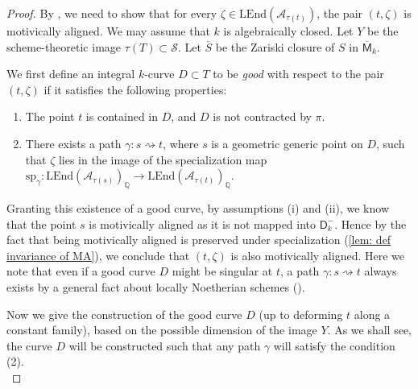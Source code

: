 \documentclass[11pt, letterpaper]{amsart}
\theoremstyle{plain}
\theoremstyle{definition}
\newcommand{\IQ}{\mathbb{Q}}
\newcommand{\<}{\langle}
\renewcommand{\>}{\rangle}
\newcommand{\shS}{\mathscr{S}}
\newcommand{\sfD}{\mathsf{D}}
\newcommand{\sfM}{\mathsf{M}}
\newcommand{\sA}{\mathcal{A}}
\newcommand{\LEnd}{\mathrm{LEnd}}
\renewcommand{\sp}{\mathrm{sp}}
\begin{document}
\begin{proof}
     By , we need to show that for every $\zeta \in \LEnd(\sA_{\tau(t)})$, the pair $(t, \zeta)$ is motivically aligned. We may assume that $k$ is algebraically closed. 
     Let $Y$ be the scheme-theoretic image $\tau(T)\subset \shS$. 
     Let $\overline{S}$ be the Zariski closure of $S$ in $\overline{\sfM}_k$. 
     
     We first define an integral $k$-curve $D\subset T$ to be \emph{good} with respect to the pair $(t,\zeta)$ if it satisfies the following properties: 
     \begin{enumerate}[label=\upshape{(\arabic*)}]
         \item The point $t$ is contained in $D$, and $D$ is not contracted by $\pi$. 
         \item There exists a path $\gamma : s \rightsquigarrow t$, where $s$ is a geometric generic point on $D$, such that $\zeta$ lies in the image of the specialization map $\sp_\gamma : \LEnd(\sA_{\tau(s)})_\IQ \to \LEnd(\sA_{\tau(t)})_\IQ$. 
     \end{enumerate}
     Granting this existence of a good curve, by assumptions (i) and (ii), we know that the point $s$ is motivically aligned as it is not mapped into $\sfD^-_k$. 
     Hence by the fact that being motivically aligned is preserved under specialization (\cref{lem: def invariance of MA}), we conclude that $(t, \zeta)$ is also motivically aligned.
     Here we note that even if a good curve $D$ might be singular at $t$, a path $\gamma : s \rightsquigarrow t$ always exists by a general fact about locally Noetherian schemes (\cite[\href{https://stacks.math.columbia.edu/tag/054F}{Tag 054F}]{stacks-project}). 
     
     Now we give the construction of the good curve $D$ (up to deforming $t$ along a constant family), based on the possible dimension of the image $Y$.
     As we shall see, the curve $D$ will be constructed such that any path $\gamma$ will satisfy the condition (2).\\
     

\end{proof}
\end{document}
